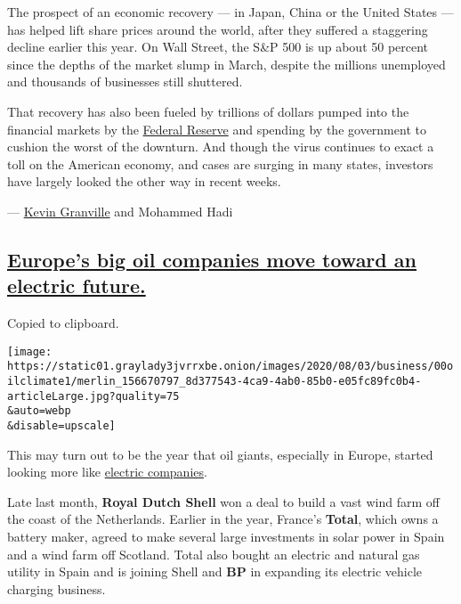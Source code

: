 The prospect of an economic recovery --- in Japan, China or the United
States --- has helped lift share prices around the world, after they
suffered a staggering decline earlier this year. On Wall Street, the
S\&P 500 is up about 50 percent since the depths of the market slump in
March, despite the millions unemployed and thousands of businesses still
shuttered.

That recovery has also been fueled by trillions of dollars pumped into
the financial markets by the
\href{https://www.nytimes3xbfgragh.onion/live/2020/08/12/business/stock-market-today-coronavirus/want-the-economy-to-rebound-wear-a-mask-federal-reserve-official-says}{Federal
Reserve} and spending by the government to cushion the worst of the
downturn. And though the virus continues to exact a toll on the American
economy, and cases are surging in many states, investors have largely
looked the other way in recent weeks.

--- \href{https://www.nytimes3xbfgragh.onion/by/kevin-granville}{Kevin
Granville} and Mohammed Hadi

\hypertarget{europes-big-oil-companies-move-toward-an-electric-future}{%
\subsection{\texorpdfstring{\protect\hyperlink{europes-big-oil-companies-move-toward-an-electric-future}{Europe's
big oil companies move toward an electric
future.}}{Europe's big oil companies move toward an electric future.}}\label{europes-big-oil-companies-move-toward-an-electric-future}}

Copied to clipboard.

\texttt{[image: https://static01.graylady3jvrrxbe.onion/images/2020/08/03/business/00oilclimate1/merlin\_156670797\_8d377543-4ca9-4ab0-85b0-e05fc89fc0b4-articleLarge.jpg?quality=75\\\&auto=webp\\\&disable=upscale]}

This may turn out to be the year that oil giants, especially in Europe,
started looking more like
\href{https://www.nytimes3xbfgragh.onion/2020/08/04/business/energy-environment/bp-renewable-investment.html}{electric
companies}.

Late last month, \textbf{Royal Dutch Shell} won a deal to build a vast
wind farm off the coast of the Netherlands. Earlier in the year,
France's \textbf{Total}, which owns a battery maker, agreed to make
several large investments in solar power in Spain and a wind farm off
Scotland. Total also bought an electric and natural gas utility in Spain
and is joining Shell and \textbf{BP} in expanding its electric vehicle
charging business.

